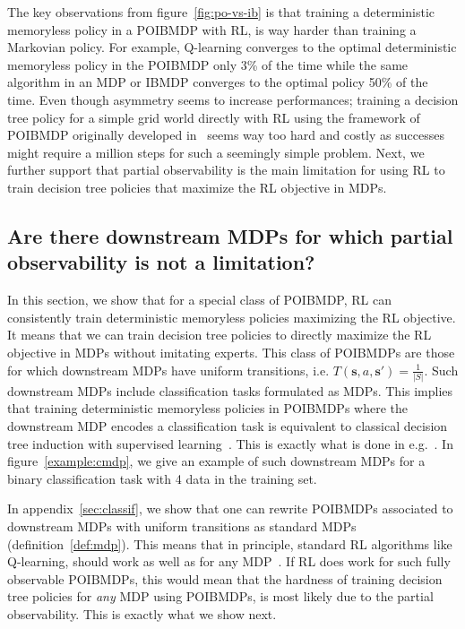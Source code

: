 The key observations from figure~\ref{fig:po-vs-ib} is that training a deterministic memoryless policy in a POIBMDP with RL, is way harder than training a Markovian policy.
For example, Q-learning converges to the optimal deterministic memoryless policy in the POIBMDP only 3\% of the time while the same algorithm in an MDP or IBMDP converges to the optimal policy 50\% of the time.
Even though asymmetry seems to increase performances; training a decision tree policy for a simple grid world directly with RL using the framework of POIBMDP originally developed in~\citet{topin2021iterative} seems way too hard and costly as successes might require a million steps for such a seemingly simple problem.
Next, we further support that partial observability is the main limitation for using RL to train decision tree policies that maximize the RL objective in MDPs.

\subsection{Are there downstream MDPs for which partial observability is not a limitation?}
In this section, we show that for a special class of POIBMDP, RL can consistently train deterministic memoryless policies maximizing the RL objective. It means that we can train decision tree policies to directly maximize the RL objective in MDPs without imitating experts.
This class of POIBMDPs are those for which downstream MDPs have uniform transitions, i.e. $T(\boldsymbol{s}, a, \boldsymbol{s}') = \frac{1}{|S|}$.
Such downstream MDPs include classification tasks formulated as MDPs.
This implies that training deterministic memoryless policies in POIBMDPs where the downstream MDP encodes a classification task is equivalent to classical decision tree induction with supervised learning~\citep{breiman1984classification}.
This is exactly what is done in e.g.~\cite{dpdt}.
In figure~\ref{example:cmdp}, we give an example of such downstream MDPs for a binary classification task with 4 data in the training set.

In appendix~\ref{sec:classif}, we show that one can rewrite POIBMDPs associated to downstream MDPs with uniform transitions as standard MDPs (definition~\ref{def:mdp}).
This means that in principle, standard RL algorithms like Q-learning, should work as well as for any MDP~\citep{watkins1992q,sutton}.
If RL does work for such fully observable POIBMDPs, this would mean that the hardness of training decision tree policies for \textit{any} MDP using POIBMDPs, is most likely due to the partial observability.
This is exactly what we show next.

